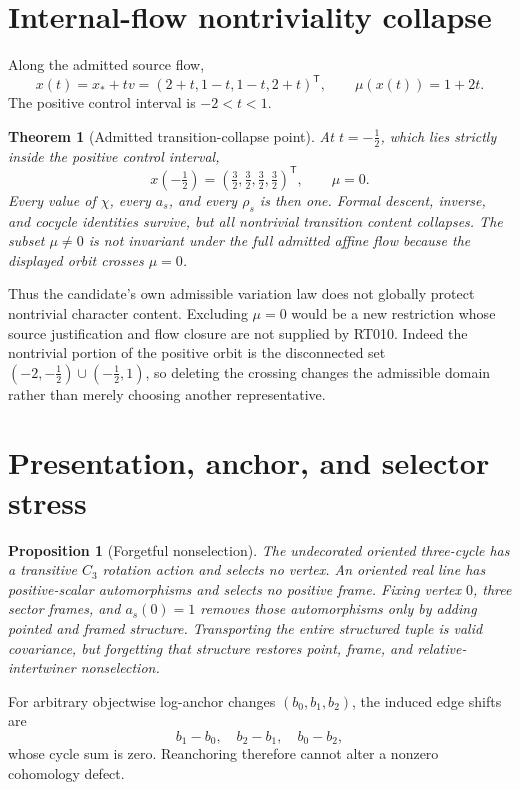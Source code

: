 \documentclass[11pt]{article}
\newtheorem{theorem}{Theorem}
\newtheorem{proposition}{Proposition}
\begin{document}
\section{Internal-flow nontriviality collapse}

Along the admitted source flow,
\[
x(t)=x_*+tv=(2+t,1-t,1-t,2+t)^\mathsf T,
\qquad \mu(x(t))=1+2t.
\]
The positive control interval is $-2<t<1$.

\begin{theorem}[Admitted transition-collapse point]
At $t=-\tfrac12$, which lies strictly inside the positive control interval,
\[
 x(-\tfrac12)=(\tfrac32,\tfrac32,\tfrac32,\tfrac32)^\mathsf T,
 \qquad \mu=0.
\]
Every value of $\chi$, every $a_s$, and every $\rho_s$ is then one.  Formal
descent, inverse, and cocycle identities survive, but all nontrivial transition
content collapses.  The subset $\mu\ne0$ is not invariant under the full
admitted affine flow because the displayed orbit crosses $\mu=0$.
\end{theorem}

Thus the candidate's own admissible variation law does not globally protect
nontrivial character content.  Excluding $\mu=0$ would be a new restriction
whose source justification and flow closure are not supplied by RT010.
Indeed the nontrivial portion of the positive orbit is the disconnected set
$(-2,-\tfrac12)\cup(-\tfrac12,1)$, so deleting the crossing changes the
admissible domain rather than merely choosing another representative.

\section{Presentation, anchor, and selector stress}

\begin{proposition}[Forgetful nonselection]
The undecorated oriented three-cycle has a transitive $C_3$ rotation action and
selects no vertex.  An oriented real line has positive-scalar automorphisms and
selects no positive frame.  Fixing vertex $0$, three sector frames, and
$a_s(0)=1$ removes those automorphisms only by adding pointed and framed
structure.  Transporting the entire structured tuple is valid covariance, but
forgetting that structure restores point, frame, and relative-intertwiner
nonselection.
\end{proposition}

For arbitrary objectwise log-anchor changes $(b_0,b_1,b_2)$, the induced edge
shifts are
\[
 b_1-b_0,\quad b_2-b_1,\quad b_0-b_2,
\]
whose cycle sum is zero.  Reanchoring therefore cannot alter a nonzero
cohomology defect.
\end{document}
